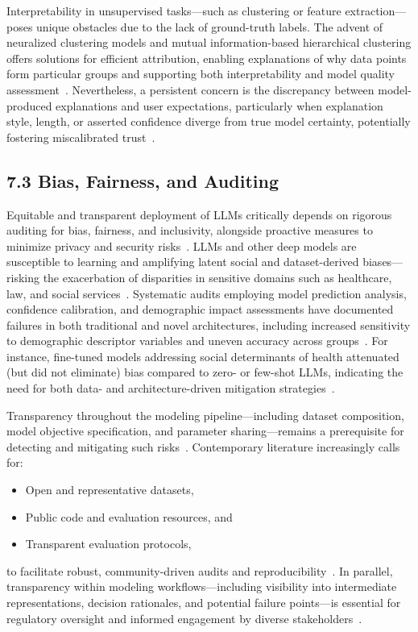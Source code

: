 \documentclass[11pt]{article}
\begin{document}
Interpretability in unsupervised tasks—such as clustering or feature extraction—poses unique obstacles due to the lack of ground-truth labels. The advent of neuralized clustering models and mutual information-based hierarchical clustering offers solutions for efficient attribution, enabling explanations of why data points form particular groups and supporting both interpretability and model quality assessment~\cite{45,52,84}. Nevertheless, a persistent concern is the discrepancy between model-produced explanations and user expectations, particularly when explanation style, length, or asserted confidence diverge from true model certainty, potentially fostering miscalibrated trust~\cite{49,81}.

\subsection{7.3 Bias, Fairness, and Auditing}

Equitable and transparent deployment of LLMs critically depends on rigorous auditing for bias, fairness, and inclusivity, alongside proactive measures to minimize privacy and security risks~\cite{1,2,3,10,14,21,22,23,36,42,43,44,46,49,52,53,65,73}. LLMs and other deep models are susceptible to learning and amplifying latent social and dataset-derived biases—risking the exacerbation of disparities in sensitive domains such as healthcare, law, and social services~\cite{3,10,21,22,23,42,43,44,49,52,53,65}. Systematic audits employing model prediction analysis, confidence calibration, and demographic impact assessments have documented failures in both traditional and novel architectures, including increased sensitivity to demographic descriptor variables and uneven accuracy across groups~\cite{22,44,49,53}. For instance, fine-tuned models addressing social determinants of health attenuated (but did not eliminate) bias compared to zero- or few-shot LLMs, indicating the need for both data- and architecture-driven mitigation strategies~\cite{22,23}.

Transparency throughout the modeling pipeline—including dataset composition, model objective specification, and parameter sharing—remains a prerequisite for detecting and mitigating such risks~\cite{14,36,46,65,73}. Contemporary literature increasingly calls for: 
\begin{itemize}
    \item Open and representative datasets,
    \item Public code and evaluation resources, and
    \item Transparent evaluation protocols,
\end{itemize}
to facilitate robust, community-driven audits and reproducibility~\cite{1,36,44,49,65,73}. In parallel, transparency within modeling workflows—including visibility into intermediate representations, decision rationales, and potential failure points—is essential for regulatory oversight and informed engagement by diverse stakeholders~\cite{14,45,46,49,52,65}.
\end{document}
